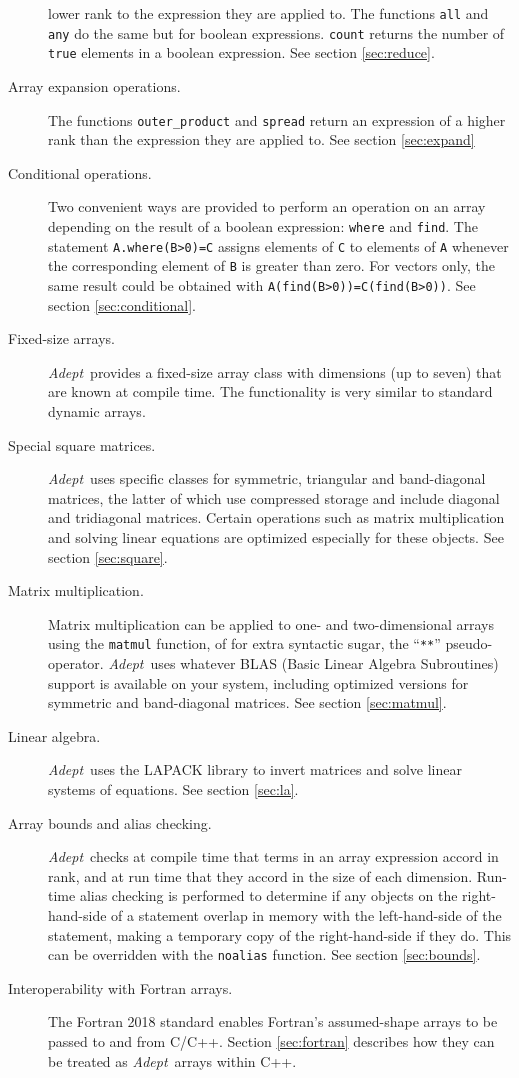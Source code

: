 \documentclass[a4,oneside]{book}
\def\codesize{\small}
\def\Adept{\emph{Adept}}
\def\code#1{{\codesize\texttt{#1}}}
\begin{document}
\begin{description}
  lower rank to the expression they are applied to. The functions
  \code{all} and \code{any} do the same but for boolean
  expressions. \code{count} returns the number of \code{true} elements
  in a boolean expression.
  See section \ref{sec:reduce}.
\item[Array expansion operations.] The functions \code{outer\_product}
  and \code{spread} return an expression of a higher rank than the
  expression they are applied to. See section \ref{sec:expand}
\item[Conditional operations.] Two convenient ways are provided to
  perform an operation on an array depending on the result of a
  boolean expression: \code{where} and \code{find}. The statement
  \code{A.where(B>0)=C} assigns elements of \code{C} to elements of
  \code{A} whenever the corresponding element of \code{B} is greater
  than zero. For vectors only, the same result could be obtained with
  \code{A(find(B>0))=C(find(B>0))}. See section \ref{sec:conditional}.
\item[Fixed-size arrays.] \Adept\ provides a fixed-size array class
  with dimensions (up to seven) that are known at compile time. The
  functionality is very similar to standard dynamic arrays.
\item[Special square matrices.] \Adept\ uses specific classes for
  symmetric, triangular and band-diagonal matrices, the latter of
  which use compressed storage and include diagonal and tridiagonal
  matrices. Certain operations such as matrix multiplication and solving
  linear equations are optimized especially for these objects. See
  section \ref{sec:square}.
\item[Matrix multiplication.] Matrix multiplication can be applied to
  one- and two-dimensional arrays using the \code{matmul} function, of
  for extra syntactic sugar, the ``\code{**}''
  pseudo-operator. \Adept\ uses whatever BLAS (Basic Linear Algebra
  Subroutines) support is available on your system, including
  optimized versions for symmetric and band-diagonal matrices. See
  section \ref{sec:matmul}.
\item[Linear algebra.] \Adept\ uses the LAPACK library to invert
  matrices and solve linear systems of equations. See section
  \ref{sec:la}.
\item[Array bounds and alias checking.] \Adept\ checks at compile time
  that terms in an array expression accord in rank, and at run time
  that they accord in the size of each dimension. Run-time alias
  checking is performed to determine if any objects on the
  right-hand-side of a statement overlap in memory with the
  left-hand-side of the statement, making a temporary copy of the
  right-hand-side if they do. This can be overridden with the
  \code{noalias} function. See section \ref{sec:bounds}.
\item[Interoperability with Fortran arrays.] The Fortran 2018 standard
  enables Fortran's assumed-shape arrays to be passed to and from
  C/C++. Section \ref{sec:fortran} describes how they can be treated
  as \Adept\ arrays within C++.
\end{description}%
%
\end{document}
